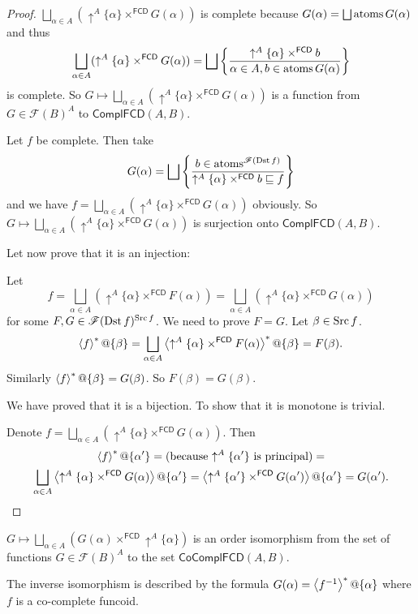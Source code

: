 \begin{proof}
$\bigsqcup_{\alpha\in A}(\uparrow^{A}\{\alpha\}\times^{\mathsf{FCD}}G(\alpha))$
is complete because $G(\alpha)=\bigsqcup\atoms G(\alpha)$ and thus
\[
\bigsqcup_{\alpha\in
A}(\uparrow^{A}\{\alpha\}\times^{\mathsf{FCD}}G(\alpha))=\bigsqcup\setcond{
\uparrow^{A}\{\alpha\}\times^{\mathsf{FCD}}b}{\alpha\in A,b\in\atoms G(\alpha)}
\]
is complete. So $G\mapsto\bigsqcup_{\alpha\in
A}(\uparrow^{A}\{\alpha\}\times^{\mathsf{FCD}}G(\alpha))$
is a function from $G\in\mathscr{F}(B)^{A}$ to $\mathsf{ComplFCD}(A,B)$.

Let $f$ be complete. Then take
\[
G(\alpha)=\bigsqcup\setcond{b\in\atoms^{\mathscr{F}(\Dst
f)}}{\uparrow^{A}\{\alpha\}\times^{\mathsf{FCD}}b\sqsubseteq f}
\]
and we have $f=\bigsqcup_{\alpha\in
A}(\uparrow^{A}\{\alpha\}\times^{\mathsf{FCD}}G(\alpha))$
obviously. So $G\mapsto\bigsqcup_{\alpha\in
A}(\uparrow^{A}\{\alpha\}\times^{\mathsf{FCD}}G(\alpha))$
is surjection onto $\mathsf{ComplFCD}(A,B)$.

Let now prove that it is an injection:

Let
\[
f=\bigsqcup_{\alpha\in
A}(\uparrow^{A}\{\alpha\}\times^{\mathsf{FCD}}F(\alpha))=\bigsqcup_{\alpha\in
A}(\uparrow^{A}\{\alpha\}\times^{\mathsf{FCD}}G(\alpha))
\]
for some $F,G\in\mathscr{F}(\operatorname{Dst} f)^{\operatorname{Src} f}$. We need to prove $F=G$.
Let $\beta\in\operatorname{Src} f$.
\[
\rsupfun f@\{\beta\}=\bigsqcup_{\alpha\in
A}\rsupfun{\uparrow^{A}\{\alpha\}\times^{\mathsf{FCD}}F(\alpha)}@\{
\beta\}=F(\beta).
\]
Similarly $\left\langle f\right\rangle ^{\ast}@\{\beta\}=G(\beta)$. So $F(\beta)=G(\beta)$.

We have proved that it is a bijection. To show that it is monotone
is trivial.

Denote $f=\bigsqcup_{\alpha\in
A}(\uparrow^{A}\{\alpha\}\times^{\mathsf{FCD}}G(\alpha))$.
Then
\begin{multline*}
\rsupfun f@\{\alpha'\}=\text{(because
\ensuremath{\uparrow^{A}\{\alpha'\}} is principal)}=\\
\bigsqcup_{\alpha\in
A}\supfun{\uparrow^{A}\{\alpha\}\times^{\mathsf{FCD}}G(\alpha)}@\{
\alpha'\}=\supfun{\uparrow^{A}\{\alpha'\}\times^{\mathsf{FCD}}G(\alpha')}
@\{\alpha'\}=G(\alpha').
\end{multline*}
\end{proof}
\begin{cor}
$G\mapsto\bigsqcup_{\alpha\in
A}(G(\alpha)\times^{\mathsf{FCD}}\uparrow^{A}\{\alpha\})$
is an order isomorphism from the set of functions $G\in\mathscr{F}(B)^{A}$
to the set $\mathsf{CoComplFCD}(A,B)$.

The inverse isomorphism is described by the formula
$G(\alpha)=\left\langle f^{-1}\right\rangle ^{\ast}@\{\alpha\}$
where $f$ is a co-complete funcoid.
\end{cor}

